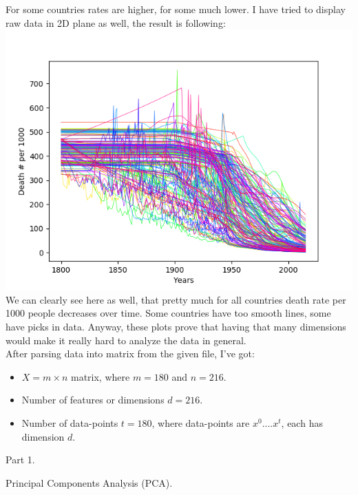 \documentclass[12pt, letterpaper]{article}
\begin{document}
\begin{enumerate}[label=\Roman*.]
		For some countries rates are higher, for some much lower. I have tried to display raw data in 2D plane as well, the result is following:\\
		\includegraphics[scale=0.75]{data.png} \\
		We can clearly see here as well, that pretty much for all countries death rate per 1000 people decreases over time. Some countries have too smooth lines, some have picks in data. Anyway, these plots prove that having that many dimensions would make it really hard to analyze the data in general. \\
		
			After parsing data into matrix from the given file, I've got:
		\begin{itemize}
		\item \(X = m \times n\) matrix, where \(m=180\) and \(n = 216\). 
		\item Number of features or dimensions \(d=216\). 
		\item Number of data-points  \(t=180\), where data-points are \(x^0....x^t\), each has dimension \(d\). \\
		\end{itemize}
	{\bf \item Part 1.} Principal Components Analysis (PCA). \\
	

\end{enumerate}
\end{document}
